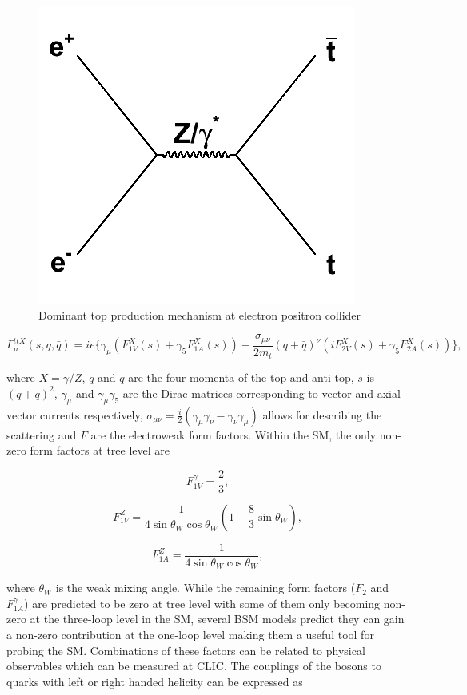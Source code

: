 \begin{figure}
\centering
\includegraphics[width=0.35\linewidth]{Theory/fig/ttFeynmann}
\caption[Dominant top production mechanism at electron positron colliders]{Dominant top production mechanism at electron positron collider}
\label{fig:topFeynmann}
\end{figure}

\begin{equation}
\Gamma_{\mu}^{t\bar{t}X}(s,q,\bar{q})= ie\{ \gamma_{\mu}(F_{1V}^{X}(s)+ \gamma_{5}F_{1A}^{X}(s)) - \frac{\sigma_{\mu\nu}}{2m_t}(q+\bar{q})^{\nu}(iF_{2V}^{X}(s) + \gamma_{5}F_{2A}^{X}(s))\},
\end{equation}

where $X=\gamma /Z$, $q$ and $\bar{q}$ are the four momenta of the top and anti top, $s$ is $(q+\bar{q})^2$, $\gamma_\mu$ and $\gamma_\mu\gamma_5$ are the Dirac matrices corresponding to vector and axial-vector currents respectively, $\sigma_{\mu\nu}=\frac{i}{2}(\gamma_\mu \gamma_\nu -\gamma_\nu \gamma_\mu)$ allows for describing the scattering and $F$ are the electroweak form factors. Within the \ac{SM}, the only non-zero form factors at tree level are

\begin{equation}
F_{1V}^{\gamma}=\frac{2}{3},
\end{equation}

\begin{equation}
F_{1V}^{Z}=\frac{1}{4\sin\theta_{W}\cos\theta_{W}}(1-\frac{8}{3}\sin\theta_{W}),
\end{equation}

\begin{equation}
F_{1A}^{Z}=\frac{1}{4\sin\theta_{W}\cos\theta_{W}},
\end{equation}

where $\theta_W$ is the weak mixing angle. While the remaining form factors ($F_2$ and $F_{1A}^{\gamma}$) are predicted to be zero at tree level with some of them only becoming non-zero at the three-loop level in the \ac{SM}, several \ac{BSM} models predict they can gain a non-zero contribution at the one-loop level making them a useful tool for probing the \ac{SM}\cite{Abe:2001swa}. Combinations of these factors can be related to physical observables which can be measured at CLIC. The couplings of the bosons to quarks with left or right handed helicity can be expressed as

